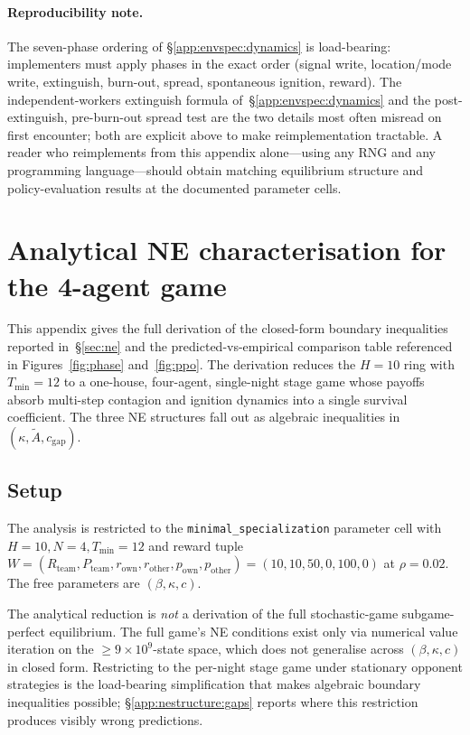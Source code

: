 \documentclass{anvil-paper}
\begin{document}
\paragraph{Reproducibility note.} The seven-phase ordering of
\S\ref{app:envspec:dynamics} is load-bearing: implementers must apply
phases in the exact order (signal write, location/mode write,
extinguish, burn-out, spread, spontaneous ignition, reward). The
independent-workers extinguish formula of~\S\ref{app:envspec:dynamics}
and the post-extinguish, pre-burn-out spread test are the two details
most often misread on first encounter; both are explicit above to make
reimplementation tractable. A reader who reimplements from this
appendix alone---using any RNG and any programming language---should
obtain matching equilibrium structure and policy-evaluation results at
the documented parameter cells.

\section{Analytical NE characterisation for the 4-agent game}
\label{app:nestructure}

This appendix gives the full derivation of the closed-form boundary
inequalities reported in~\S\ref{sec:ne} and the predicted-vs-empirical
comparison table referenced in Figures~\ref{fig:phase}
and~\ref{fig:ppo}. The derivation reduces the $H{=}10$ ring with
$T_{\min}{=}12$ to a one-house, four-agent, single-night stage game
whose payoffs absorb multi-step contagion and ignition dynamics into a
single survival coefficient. The three NE structures fall out as
algebraic inequalities in $(\kappa,\tilde A,c_{\text{gap}})$.

\subsection{Setup}
\label{app:nestructure:setup}

The analysis is restricted to the \texttt{minimal\_specialization}
parameter cell with $H{=}10,N{=}4,T_{\min}{=}12$ and reward tuple
$W=(R_{\text{team}},P_{\text{team}},r_{\text{own}},r_{\text{other}},
p_{\text{own}},p_{\text{other}})=(10,10,50,0,100,0)$ at $\rho{=}0.02$.
The free parameters are $(\beta,\kappa,c)$.

The analytical reduction is \emph{not} a derivation of the full
stochastic-game subgame-perfect equilibrium. The full game's NE
conditions exist only via numerical value iteration on the
$\geq 9\times 10^{9}$-state space, which does not generalise across
$(\beta,\kappa,c)$ in closed form. Restricting to the per-night stage
game under stationary opponent strategies is the load-bearing
simplification that makes algebraic boundary inequalities possible;
\S\ref{app:nestructure:gaps} reports where this restriction produces
visibly wrong predictions.
\end{document}

